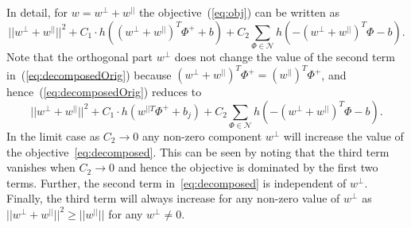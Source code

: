 \documentclass[table]{article} %
\begin{document}
In detail, for $w=w^{\perp}+w^{||}$ the objective~(\ref{eq:obj}) can be written as
	  	\begin{equation}
	        ||w^{\perp}+w^{||}||^{2} +
	        C_1 \cdot h
	        \left(
	        	(w^{\perp}+w^{||})^T\Phi^+ + b
	        \right)+
	        C_2\sum_{\Phi\in \mathcal N} h
	        \left(
	        	-(w^{\perp}+w^{||})^T\Phi-b
	        \right).
            \label{eq:decomposedOrig}
	   \end{equation}
	  	Note that the orthogonal part $w^{\perp}$ does not change the value of  the second term in~(\ref{eq:decomposedOrig}) because $(w^{\perp}+w^{||})^T\Phi^+=(w^{||})^T\Phi^+$, and hence~(\ref{eq:decomposedOrig}) reduces to
        \begin{equation} 
            ||w^{\perp}+w^{||}||^{2} +
            C_1 \cdot h
            \left(
                w^{||T}\Phi^+ +b_j
            \right)+
            C_2\sum_{\Phi\in \mathcal N} h
            \left(
                -(w^{\perp}+w^{||})^T\Phi-b
            \right).
            \label{eq:decomposed} 
        \end{equation}  
        	In the limit case as $C_2 \rightarrow 0$ any non-zero component $w^{\perp}$
	will increase the value of the objective~\eqref{eq:decomposed}. 
	This can be seen by noting that the third term vanishes when $C_2 \rightarrow 0$ and hence the objective is dominated by the first two terms. Further,  	
	the second term in~\eqref{eq:decomposed} is independent of $w^{\perp}$. Finally, the third term will always increase for any non-zero value of $w^{\perp}$ as 
        $||w^{\perp}+w^{||}||^{2} \geq ||w^{||}||$ for any $w^{\perp}\neq0$.
		             
\end{document}
